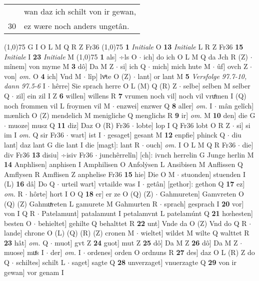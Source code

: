 \documentclass[8pt,a4paper,notitlepage]{article}
\begin{document}
\begin{table}[ht]
\begin{minipage}[t]{0.5\linewidth}
\begin{tabular}{rl}
 & wan daz ich schilt von ir gewan,\\ 
30 & ez wære noch anders ungetân.\\ 
\end{tabular}
\scriptsize
\line(1,0){75} \newline
G I O L M Q R Z Fr36 \newline
\line(1,0){75} \newline
\textbf{1} \textit{Initiale} O  \textbf{13} \textit{Initiale} L R Z Fr36  \textbf{15} \textit{Initiale} I  \textbf{23} \textit{Initiale} M  \newline
\line(1,0){75} \newline
\textbf{1} als] ÷ls O  $\cdot$ ich] do ich O L M Q da Jch R (Z)  $\cdot$ mînem] von myme M \textbf{3} dô] Da M Z  $\cdot$ si] ich Q  $\cdot$ mich] mich hute M  $\cdot$ ûf] ovch Z  $\cdot$ von] \textit{om.} O \textbf{4} ich] Vnd M  $\cdot$ lîp] lvͤte O (Z)  $\cdot$ lant] or lant M \textbf{5} \textit{Versfolge 97.7-10, dann 97.5-6} I   $\cdot$ hêrre] Sie sprach herre O L (M) Q (R) Z  $\cdot$ selbe] selben M selber Q  $\cdot$ zil] ein zil I Z \textbf{6} willen] willens R \textbf{7} vrumen noch vil] noch vil vruͤmen I (Q) noch frommen vil L froymen vil M  $\cdot$ enzwei] enzwer Q \textbf{8} aller] \textit{om.} I  $\cdot$ mân gelîch] mænlich O (Z) mendelich M menigliche Q menglichs R \textbf{9} ir] \textit{om.} M \textbf{10} den] die G  $\cdot$ muoze] musz Q \textbf{11} diz] Daz O (R) Fr36  $\cdot$ lobte] lop I Q Fr36 lobt O R Z  $\cdot$ si] si im I \textit{om.} Q sir Fr36  $\cdot$ wart] ist I  $\cdot$ gesaget] gesant M \textbf{12} enpfie] phinck Q  $\cdot$ diu lant] daz lant G die lant I die [magt]: lant R  $\cdot$ ouch] \textit{om.} I O L M Q R Fr36  $\cdot$ die] div Fr36 \textbf{13} disiu] ÷isiv Fr36  $\cdot$ junchêrrelîn] [ch]: ivnch herrelin G Junge herlin M \textbf{14} Anphlisen] anphisen I Amphilisen O Anfolẏsen L Ansibisen M Anflissen Q Amflysen R Amflisen Z anphelise Fr36 \textbf{15} hie] Die O M  $\cdot$ stuonden] stuenden I (L) \textbf{16} dâ] Do Q  $\cdot$ urteil wart] vrtailde was I  $\cdot$ getân] [gethor]: gethon Q \textbf{17} ez] \textit{om.} R  $\cdot$ hôrte] hort I O Q \textbf{18} er] er ze O (Q) (Z)  $\cdot$ Gahmureten] Gamvreten O (Q) (Z) Gahmuͯreten L gamurete M Gahmurten R  $\cdot$ sprach] gesprach I \textbf{20} vor] von I Q R  $\cdot$ Patelamunt] patalamunt I petalamvnt L patelamúnt Q \textbf{21} hœhesten] besten O  $\cdot$ behieltet] gehilte Q behalttet R \textbf{22} unt] Vnde da O (Z) Vnd do Q R  $\cdot$ lande] chrone O (L) (Q) (R) (Z) cronen M  $\cdot$ wieltet] wildet M wilte Q walttet R \textbf{23} hât] \textit{om.} Q  $\cdot$ muot] gvt Z \textbf{24} guot] mut Z \textbf{25} dô] Da M Z \textbf{26} dô] Da M Z  $\cdot$ muose] muͤs I  $\cdot$ der] \textit{om.} I  $\cdot$ ordenes] orden O ordnuns R \textbf{27} des] daz O L (R) Z do Q  $\cdot$ schiltes] schilt L  $\cdot$ saget] sagte Q \textbf{28} unverzaget] vnuerzagte Q \textbf{29} von ir gewan] vor genam I \newline

\end{minipage}
\end{table}
\end{document}
